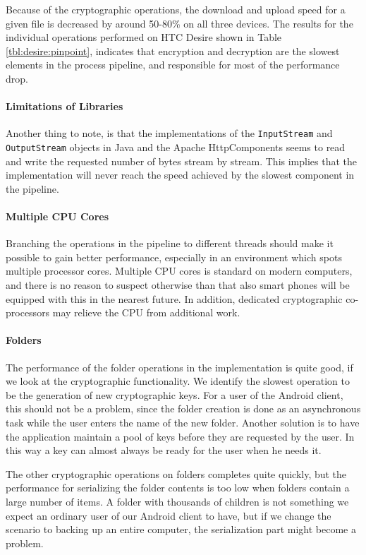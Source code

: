 \documentclass[pdftex,english,10pt,b5paper,twoside]{book}
\begin{document}
Because of the cryptographic operations, the download and upload speed for a
given file is decreased by around 50-80\% on all three devices. The results for
the individual operations performed on HTC Desire shown in Table
\ref{tbl:desire:pinpoint}, indicates that encryption and decryption are the
slowest elements in the process pipeline, and responsible for most of the
performance drop. 

\paragraph{Limitations of Libraries} Another thing to note, is that the
implementations of the \texttt{InputStream} and \texttt{OutputStream} objects
in Java and the Apache HttpComponents seems to read and write the requested
number of bytes stream by stream. This implies that the implementation will
never reach the speed achieved by the slowest component in the pipeline.

\paragraph{Multiple CPU Cores} Branching the operations in the pipeline to
different threads should make it possible to gain better performance,
especially in an environment which spots multiple processor cores. Multiple
\ac{CPU} cores is standard on modern computers, and there is no reason to
suspect otherwise than that also smart phones will be equipped with this in the
nearest future. In addition, dedicated cryptographic co-processors may
relieve the \ac{CPU} from additional work.

\paragraph{Folders} The performance of the folder operations in the
implementation is quite good, if we look at the cryptographic
functionality. We identify the slowest operation to be the generation of
new cryptographic keys. For a user of the Android client, this should not be a
problem, since the folder creation is done as an asynchronous task while the
user enters the name of the new folder. Another solution is to have the
application maintain a pool of keys before they are requested by the user. In
this way a key can almost always be ready for the user when he needs it.

The other cryptographic operations on folders completes quite quickly, but the
performance for serializing the folder contents is too low when folders contain
a large number of items. A folder with thousands of children is not
something we expect an ordinary user of our Android client to have, but if we
change the scenario to backing up an entire computer, the serialization part
might become a problem. 
\end{document}
